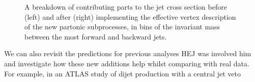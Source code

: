 \begin{figure}[H] 
\centering
{} 
\caption{A breakdown of contributing parts to the jet cross section before (left) and after (right) implementing the effective vertex description of the new partonic subprocesses, in bins of the invariant mass between the most forward and backward jets.}
\label{fig:fklmigration}
\end{figure}

We can also revisit the predictions for previous analyses HEJ was involved him and investigate how these new additions help whilst comparing with real data. For example, in an ATLAS study of dijet production with a central jet veto \cite{Aad2011} 

